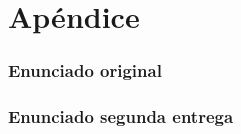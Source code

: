 \documentclass[a4paper,11pt]{article}
\begin{document}
\part{Apéndice}
\appendix

\section{Enunciado original}\label{sec:enunciado}


\section{Enunciado segunda entrega}\label{sec:enunciado}

\end{document}
